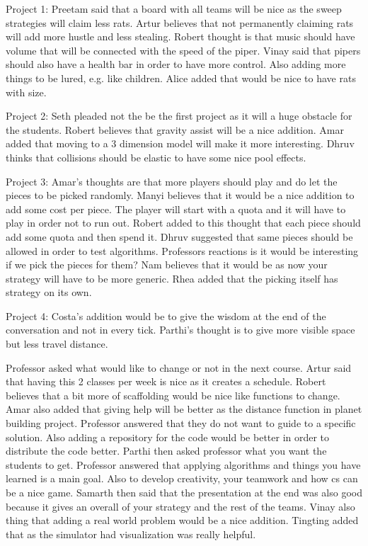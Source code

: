 Project 1:
Preetam said that a board with all teams will be nice as the sweep strategies will
claim less rats. Artur believes that not permanently claiming rats will add more
hustle and less stealing. Robert thought is that music should have volume that 
will be connected with the speed of the piper. Vinay said that pipers should also
have a health bar in order to have more control. Also adding more things to be 
lured, e.g. like children. Alice added that would be nice to have rats with size.

Project 2:
Seth pleaded not the be the first project as it will a huge obstacle for the students.
Robert believes that gravity assist will be a nice addition. Amar added that
moving to a 3 dimension model will make it more interesting. Dhruv thinks that 
collisions should be elastic to have some nice pool effects. 

Project 3:
Amar's thoughts are that more players should play and do let the pieces to be picked
randomly. Manyi believes that it would be a nice addition to add some cost per
piece. The player will start with a quota and it will have to play in order not
to run out. Robert added to this thought that each piece should add some quota 
and then spend it. Dhruv suggested that same pieces should be allowed in order
to test algorithms. Professors reactions is it would be interesting if we pick 
the pieces for them? Nam believes that it would be as now your strategy will have
to be more generic. Rhea added that the picking itself has strategy on its own.

Project 4:
Costa's addition would be to give the wisdom at the end of the conversation and 
not in every tick. Parthi's thought is to give more visible space but less travel
distance.

Professor asked what would like to change or not in the next course. Artur said
that having this 2 classes per week is nice as it creates a schedule. Robert
believes that a bit more of scaffolding would be nice like functions to change.
Amar also added that giving help will be better as the distance function in 
planet building project. Professor answered that they do not want to guide to a
specific solution. Also adding a repository for the code would be better in order
to distribute the code better. Parthi then asked professor what you want the 
students to get. Professor answered that applying algorithms and things you have
learned is a main goal. Also to develop creativity, your teamwork and how cs can
be a nice game. Samarth then said that the presentation at the end was also good
because it gives an overall of your strategy and the rest of the teams. Vinay also
thing that adding a real world problem would be a nice addition. Tingting added
that as the simulator had visualization was really helpful.
